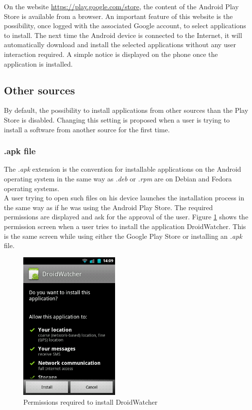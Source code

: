 On the website \url{https://play.google.com/store}, the content of the Android Play Store is available from a browser.
An important feature of this website is the possibility, once logged with the associated Google account, to select applications to install.
The next time the Android device is connected to the Internet, it will automatically download and install the selected applications without any user interaction required.
A simple notice is displayed on the phone once the application is installed.\\


\subsection{Other sources}
By default, the possibility to install applications from other sources than the Play Store is disabled.
Changing this setting is proposed when a user is trying to install a software from another source for the first time.

\subsubsection{.apk file}
The \emph{.apk} extension is the convention for installable applications on the Android operating system in the same way as \emph{.deb} or \emph{.rpm} are on Debian and Fedora operating systems.\\

A user trying to open such files on his device launches the installation process in the same way as if he was using the Android Play Store.
The required permissions are displayed and ask for the approval of the user.
Figure \ref{fig:perm-dw} shows the permission screen when a user tries to install the application DroidWatcher.
This is the same screen while using either the Google Play Store or installing an \emph{.apk} file.\\

\begin{figure}[h]
  \centering
  \includegraphics[width=5cm]{images/permissions.png}
  \caption{Permissions required to install DroidWatcher}
  \label{fig:perm-dw}
\end{figure}

